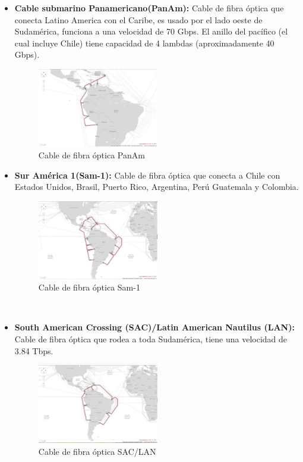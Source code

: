 \documentclass[a4paper]{article}
\begin{document}
\begin{itemize}

\item\textbf{Cable submarino Panamericano(PanAm):} Cable de fibra óptica que conecta Latino America con el Caribe, es usado por el lado oeste de Sudamérica, funciona a una velocidad de 70 Gbps. El anillo del pacífico (el cual incluye Chile) tiene capacidad de 4 lambdas (aproximadamente 40 Gbps).

\begin{figure}[H]
\centering
\includegraphics[width=0.5\textwidth]{PanAm.PNG}
\caption{\label{fig:PanAm} Cable de fibra óptica PanAm}
\end{figure}

\item\textbf{Sur América 1(Sam-1):} Cable de fibra óptica que conecta a Chile con Estados Unidos, Brasil, Puerto Rico, Argentina, Perú Guatemala y Colombia.

\begin{figure}[H]
\centering
\includegraphics[width=0.5\textwidth]{Sam1.PNG}
\caption{\label{fig:Sam} Cable de fibra óptica Sam-1}
\end{figure}

~\\[4.0cm]

\item\textbf{South American Crossing (SAC)/Latin American Nautilus (LAN):} Cable de fibra óptica que rodea a toda Sudamérica, tiene una velocidad de 3.84 Tbps.

\begin{figure}[H]
\centering
\includegraphics[width=0.5\textwidth]{Nautilus.PNG}
\caption{\label{fig:SAC/LAN} Cable de fibra óptica SAC/LAN}
\end{figure}

\end{itemize}
\end{document}
